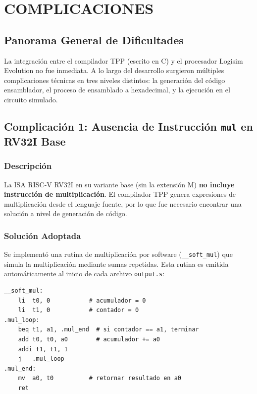 \chapter{COMPLICACIONES}

\section{Panorama General de Dificultades}

La integración entre el compilador TPP (escrito en C) y el procesador Logisim Evolution no fue inmediata. A lo largo del desarrollo surgieron múltiples complicaciones técnicas en tres niveles distintos: la generación del código ensamblador, el proceso de ensamblado a hexadecimal, y la ejecución en el circuito simulado.

\section{Complicación 1: Ausencia de Instrucción \texttt{mul} en RV32I Base}

\subsection{Descripción}

La ISA RISC-V RV32I en su variante base (sin la extensión M) \textbf{no incluye instrucción de multiplicación}. El compilador TPP genera expresiones de multiplicación desde el lenguaje fuente, por lo que fue necesario encontrar una solución a nivel de generación de código.

\subsection{Solución Adoptada}

Se implementó una rutina de multiplicación por software (\texttt{\_\_soft\_mul}) que simula la multiplicación mediante sumas repetidas. Esta rutina es emitida automáticamente al inicio de cada archivo \texttt{output.s}:

\begin{lstlisting}[style=asmstyle, caption={Rutina \_\_soft\_mul generada automáticamente}]
__soft_mul:
    li  t0, 0           # acumulador = 0
    li  t1, 0           # contador = 0
.mul_loop:
    beq t1, a1, .mul_end  # si contador == a1, terminar
    add t0, t0, a0        # acumulador += a0
    addi t1, t1, 1
    j   .mul_loop
.mul_end:
    mv  a0, t0          # retornar resultado en a0
    ret
\end{lstlisting}

